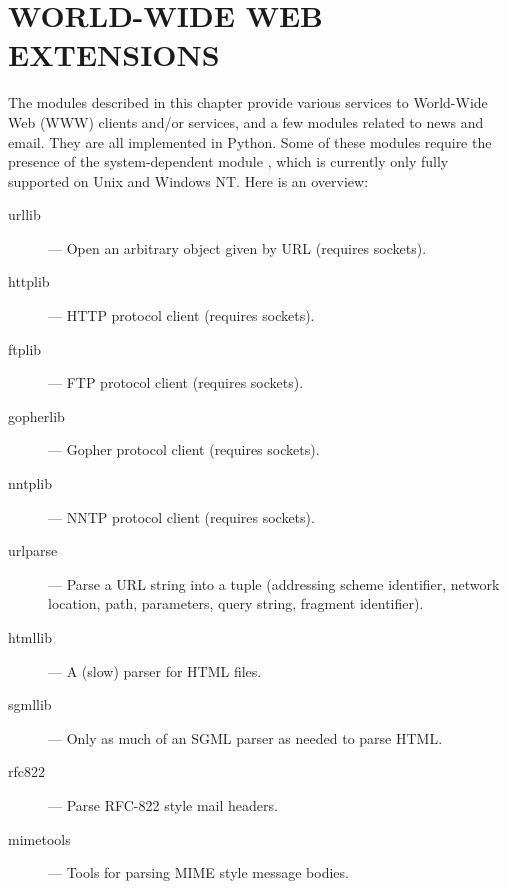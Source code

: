 \chapter{WORLD-WIDE WEB EXTENSIONS}

The modules described in this chapter provide various services to
World-Wide Web (WWW) clients and/or services, and a few modules
related to news and email.  They are all implemented in Python.  Some
of these modules require the presence of the system-dependent module
, which is currently only fully supported on Unix and
Windows NT.  Here is an overview:

\begin{description}

\item[urllib]
--- Open an arbitrary object given by URL (requires sockets).

\item[httplib]
--- HTTP protocol client (requires sockets).

\item[ftplib]
--- FTP protocol client (requires sockets).

\item[gopherlib]
--- Gopher protocol client (requires sockets).

\item[nntplib]
--- NNTP protocol client (requires sockets).

\item[urlparse]
--- Parse a URL string into a tuple (addressing scheme identifier, network
location, path, parameters, query string, fragment identifier).

\item[htmllib]
--- A (slow) parser for HTML files.

\item[sgmllib]
--- Only as much of an SGML parser as needed to parse HTML.

\item[rfc822]
--- Parse RFC-822 style mail headers.

\item[mimetools]
--- Tools for parsing MIME style message bodies.

\end{description}
